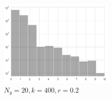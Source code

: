 \documentclass{article}
\begin{document}
\begin{multicols}{2}
\begin{figure}[H]
	  		\label{fig:popNg20k50}
  		\end{figure}
  		\begin{figure}[H]
			\center
			\includegraphics[width=\linewidth, height=120pt]{data/population_Ng20_k400.png}
			\caption{\(N_g=20, k=400, r=0.2\)}
	  		\label{fig:popNg20k400}
  		\end{figure}
  		\end{multicols}
		\newpage
\end{document}
